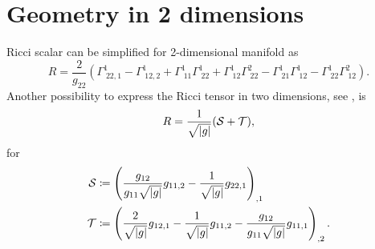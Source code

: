 \section{Geometry in 2 dimensions}
Ricci scalar can be simplified for 2-dimensional manifold as
\begin{equation}
    R=\frac{2}{g_{22}}\left(\Gamma^1_{\;22,1}-\Gamma^1_{\;12,2}+\Gamma^1_{\;11}\Gamma^1_{\;22}+\Gamma^1_{\;12}\Gamma^2_{\;22}-\Gamma^1_{\;21}\Gamma^1_{\;12}-\Gamma^1_{\;22}\Gamma^2_{\;12}\right).
    \label{eq:Ricci2D}
\end{equation}
Another possibility to express the Ricci tensor in two dimensions, see \citet[eq. 6,7]{geometricTensorLipkin}, is
\begin{equation}
    R=\frac{1}{\sqrt{\left|{g}\right|}}(\mathcal{S}+\mathcal{T}),
\end{equation}
for
\begin{align}
    \mathcal{S}&\coloneqq \left(\frac{g_{12}}{g_{11}\sqrt{\left|{g}\right|}}g_{11,2}-\frac{1}{\sqrt{\left|{g}\right|}}g_{22,1}\right)_{,1}\\
    \mathcal{T}&\coloneqq \left(\frac{2}{\sqrt{\left|{g}\right|}}g_{12,1}-\frac{1}{\sqrt{\left|{g}\right|}}g_{11,2}-\frac{g_{12}}{g_{11}\sqrt{\left|{g}\right|}}g_{11,1}\right)_{,2}.
\end{align}

